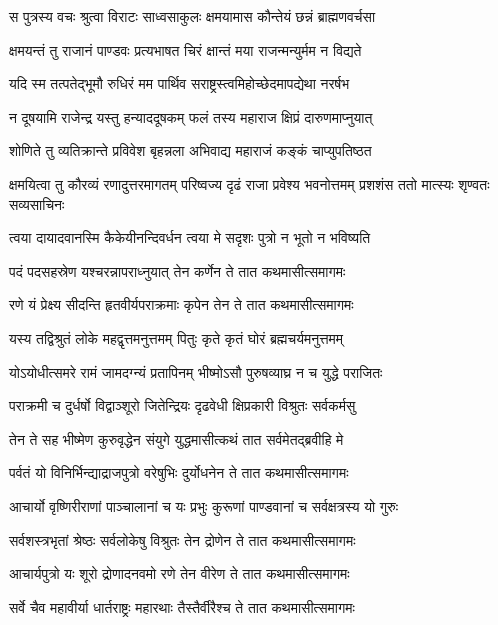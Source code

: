 \twolineshloka
{स पुत्रस्य वचः श्रुत्वा विराटः साध्वसाकुलः}
{क्षमयामास कौन्तेयं छन्नं ब्राह्मणवर्चसा}


\twolineshloka
{क्षमयन्तं तु राजानं पाण्डवः प्रत्यभाषत}
{चिरं क्षान्तं मया राजन्मन्युर्मम न विद्यते}


\twolineshloka
{यदि स्म तत्पतेद्भूमौ रुधिरं मम पार्थिव}
{सराष्ट्रस्त्वमिहोच्छेदमापद्येथा नरर्षभ}


\twolineshloka
{न दूषयामि राजेन्द्र यस्तु हन्याददूषकम्}
{फलं तस्य महाराज क्षिप्रं दारुणमाप्नुयात्}



\twolineshloka
{शोणिते तु व्यतिक्रान्ते प्रविवेश बृहन्नला}
{अभिवाद्य महाराजं कङ्कं चाप्युपतिष्ठत}


\threelineshloka
{क्षमयित्वा तु कौरव्यं रणादुत्तरमागतम्}
{परिष्वज्य दृढं राजा प्रवेश्य भवनोत्तमम्}
{प्रशशंस ततो मात्स्यः शृण्वतः सव्यसाचिनः}




\twolineshloka
{त्वया दायादवानस्मि कैकेयीनन्दिवर्धन}
{त्वया मे सदृशः पुत्रो न भूतो न भविष्यति}


\twolineshloka
{पदं पदसहस्रेण यश्चरन्नापराध्नुयात्}
{तेन कर्णेन ते तात कथमासीत्समागमः}


\twolineshloka
{रणे यं प्रेक्ष्य सीदन्ति हृतवीर्यपराक्रमाः}
{कृपेन तेन ते तात कथमासीत्समागमः}


\twolineshloka
{यस्य तद्विश्रुतं लोके महद्वृत्तमनुत्तमम्}
{पितुः कृते कृतं घोरं ब्रह्मचर्यमनुत्तमम्}


\twolineshloka
{योऽयोधीत्समरे रामं जामदग्न्यं प्रतापिनम्}
{भीष्मोऽसौ पुरुषव्याघ्र न च युद्धे पराजितः}


\twolineshloka
{पराक्रमी च दुर्धर्षो विद्वाञ्शूरो जितेन्द्रियः}
{दृढवेधी क्षिप्रकारी विश्रुतः सर्वकर्मसु}


\twolineshloka
{तेन ते सह भीष्मेण कुरुवृद्धेन संयुगे}
{युद्धमासीत्कथं तात सर्वमेतद्ब्रवीहि मे}


\twolineshloka
{पर्वतं यो विनिर्भिन्द्याद्राजपुत्रो वरेषुभिः}
{दुर्योधनेन ते तात कथमासीत्समागमः}


\twolineshloka
{आचार्यो वृष्णिरीराणां पाञ्चालानां च यः प्रभुः}
{कुरूणां पाण्डवानां च सर्वक्षत्रस्य यो गुरुः}


\twolineshloka
{सर्वशस्त्रभृतां श्रेष्ठः सर्वलोकेषु विश्रुतः}
{तेन द्रोणेन ते तात कथमासीत्समागमः}


\twolineshloka
{आचार्यपुत्रो यः शूरो द्रोणादनवमो रणे}
{तेन वीरेण ते तात कथमासीत्समागमः}


\twolineshloka
{सर्वे चैव महावीर्या धार्तराष्ट्रः महारथाः}
{तैस्तैर्वीरैश्च ते तात कथमासीत्समागमः}

